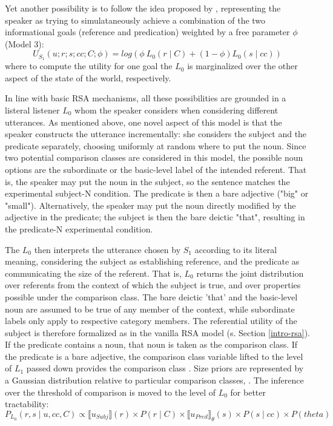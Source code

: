 Yet another possibility is to follow the idea proposed by \textcite{yoon2016talking}, representing the speaker as trying to simulataneously achieve a combination of the two informational goals (reference and predication) weighted by a free parameter $\phi$ (Model 3):
\begin{equation}
U_{S_1} (u; r; s; cc; C; \phi) = log(\phi \: L_0(r \mid C) + (1 - \phi) L_0(s \mid cc))
\end{equation} 
where to compute the utility for one goal the $L_0$ is marginalized over the other aspect of the state of the world, respectively.

In line with basic RSA mechanisms, all these possibilities are grounded in a listeral listener $L_0$ whom the speaker considers when considering different utterances. As mentioned above, one novel aspect of this model is that the speaker constructs the utterance incrementally: she considers the subject and the predicate separately, choosing uniformly at random where to put the noun. Since two potential comparison classes are considered in this model, the possible noun options are the subordinate or the basic-level label of the intended referent. That is, the speaker may put the noun in the subject, so the sentence matches the experimental subject-N condition. The predicate is then a bare adjective ("big" or "small"). %
Alternatively, the speaker may put the noun directly modified by the adjective in the predicate; the subject is then the bare deictic "that", resulting in the predicate-N experimental condition. 

The $L_0$ then interprets the utterance chosen by $S_1$ according to its literal meaning, considering the subject as establishing reference, and the predicate as communicating the size of the referent. That is, $L_0$ returns the joint distribution over referents from the context of which the subject is true, and over properties possible under the comparison class. The bare deictic 'that' and the basic-level noun are assumed to be true of any member of the context, while subordinate labels only apply to respective category members. The referential utility of the subject is therefore formalized as in the vanilla RSA model (s. Section \ref{intro-rsa}). If the predicate contains a noun, that noun is taken as the comparison class. If the predicate is a bare adjective, the comparison class variable lifted to the level of $L_1$ passed down provides the comparison class \parencite{tessler2017warm}. Size priors are represented by a Gaussian distribution relative to particular comparison classes, \textcite[as proposed by][]{tessler2017warm}. The inference over the threshold of comparison is moved to the level of $L_0$ for better tractability: 
\begin{equation}
P_{L_0} (r, s \mid u, cc, C) \propto \llbracket u_{Subj} \rrbracket (r) \times P(r \mid C) \times  \llbracket u_{Pred} \rrbracket_{\theta} (s) \times P(s \mid cc) \times P(theta)
\end{equation}

